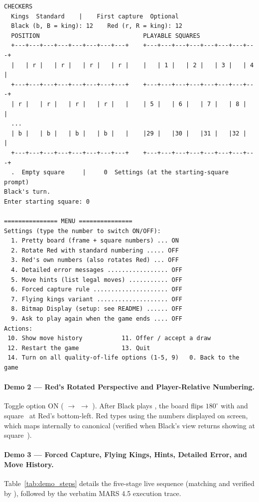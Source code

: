 \begin{lstlisting}[style=termstyle]
  CHECKERS
  Kings  Standard    |    First capture  Optional
  Black (b, B = king): 12    Red (r, R = king): 12
  POSITION                             PLAYABLE SQUARES
  +---+---+---+---+---+---+---+---+    +---+---+---+---+---+---+---+---+
  |   | r |   | r |   | r |   | r |    |   | 1 |   | 2 |   | 3 |   | 4 |
  +---+---+---+---+---+---+---+---+    +---+---+---+---+---+---+---+---+
  | r |   | r |   | r |   | r |   |    | 5 |   | 6 |   | 7 |   | 8 |   |
  ...
  | b |   | b |   | b |   | b |   |    |29 |   |30 |   |31 |   |32 |   |
  +---+---+---+---+---+---+---+---+    +---+---+---+---+---+---+---+---+
  .  Empty square     |     0  Settings (at the starting-square prompt)
Black's turn.
Enter starting square: 0

=============== MENU ===============
Settings (type the number to switch ON/OFF):
  1. Pretty board (frame + square numbers) ... ON
  2. Rotate Red with standard numbering ..... OFF
  3. Red's own numbers (also rotates Red) ... OFF
  4. Detailed error messages ................. OFF
  5. Move hints (list legal moves) ........... OFF
  6. Forced capture rule ..................... OFF
  7. Flying kings variant .................... OFF
  8. Bitmap Display (setup: see README) ...... OFF
  9. Ask to play again when the game ends .... OFF
Actions:
 10. Show move history           11. Offer / accept a draw
 12. Restart the game            13. Quit
 14. Turn on all quality-of-life options (1-5, 9)   0. Back to the game
\end{lstlisting}

\paragraph{Demo 2 — Red's Rotated Perspective and Player-Relative Numbering.}
Toggle option  ON ( $\to$  $\to$ ). After Black plays , the board flips $180^\circ$ with  and square~ at Red's bottom-left. Red types  using the numbers displayed on screen, which  maps internally to canonical  (verified when Black's view returns showing  at square~).

\paragraph{Demo 3 — Forced Capture, Flying Kings, Hints, Detailed Error, and Move History.}
Table~\ref{tab:demo_steps} details the five-stage live sequence (matching  and verified by ), followed by the verbatim MARS 4.5 execution trace.

